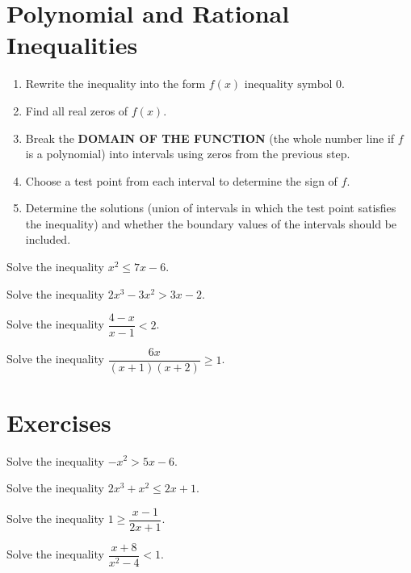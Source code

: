 \newpage
\section{Polynomial and Rational Inequalities}
\begin{howto}
\begin{enumerate}
  \item Rewrite the inequality into the form $f(x)\text{~inequality symbol~} 0$.
  \item Find all real zeros of $f(x)$.
  \item Break the \textbf{\uppercase{domain of the function}} (the whole number line if $f$ is a polynomial) into intervals using zeros from the previous step.
  \item Choose a test point from each interval to determine the sign of $f$.
  \item Determine the solutions (union of intervals in which the test point satisfies the inequality) and whether the boundary values of the intervals should be included.
\end{enumerate}
\end{howto}

\begin{example}
  Solve the inequality $x^{2} \le 7 x - 6$.
\end{example}

\begin{example}
  Solve the inequality $2 x^{3} - 3 x^{2} >  3 x - 2$.
\end{example}

\newpage

\begin{example}
  Solve the inequality $\dfrac{4-x}{x - 1}< 2$.
\end{example}

\begin{example}
  Solve the inequality $\dfrac{6 x}{(x + 1) (x + 2)}\ge 1$.
\end{example}


\newpage
\section*{Exercises}

\begin{exercise}
  Solve the inequality $-x^2>5x-6$.
\end{exercise}

\begin{exercise}
  Solve the inequality $2 x^{3} + x^{2} \le 2 x + 1$.
\end{exercise}

\newpage

\begin{exercise}
  Solve the inequality $1\ge \dfrac{x-1}{2x+1}$.
\end{exercise}

\begin{exercise}
  Solve the inequality $\dfrac{x+8}{x^2-4}<1$.
\end{exercise}
